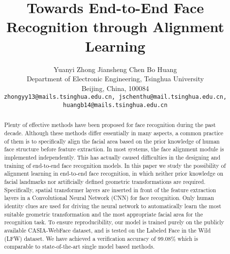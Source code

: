 \documentclass[10pt,twocolumn,letterpaper]{article}
\begin{document}
\setlength{\textfloatsep}{8pt plus 1.0pt minus 2.0pt}
\setlength{\abovecaptionskip}{1mm}
\setlength{\belowcaptionskip}{1mm}
\setlength{\abovedisplayskip}{1pt plus 2pt minus 6pt}
\title{Towards End-to-End Face Recognition through Alignment Learning}

\author{Yuanyi Zhong \qquad Jiansheng Chen \qquad Bo Huang \\
Department of Electronic Engineering, Tsinghua University\\
Beijing, China, 100084\\
{\tt\small zhongyy13@mails.tsinghua.edu.cn, jschenthu@mail.tsinghua.edu.cn, huangb14@mails.tsinghua.edu.cn}
}

\maketitle

\begin{abstract}

Plenty of effective methods have been proposed for face recognition during the past decade. Although these methods differ essentially in many aspects, a common practice of them is to specifically align the facial area based on the prior knowledge of human face structure before feature extraction. In most systems, the face alignment module is implemented independently. This has actually caused difficulties in the designing and training of end-to-end face recognition models. In this paper we study the possibility of alignment learning in end-to-end face recognition, in which neither prior knowledge on facial landmarks nor artificially defined geometric transformations are required. Specifically, spatial transformer layers are inserted in front of the feature extraction layers in a Convolutional Neural Network (CNN) for face recognition.  Only human identity clues are used for driving the neural network to automatically learn the most suitable geometric transformation and the most appropriate facial area for the recognition task. To ensure reproducibility, our model is trained purely on the publicly available CASIA-WebFace dataset, and is tested on the Labeled Face in the Wild (LFW) dataset. We have achieved a verification accuracy of 99.08\% which is comparable to state-of-the-art single model based methods. 

\end{abstract}
\end{document}
